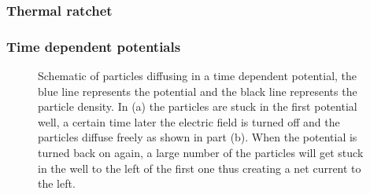 \documentclass[11pt]{article} %
\begin{document}
\subsubsection{Thermal ratchet}
\cite{Pedro2014}

\subsubsection{Time dependent potentials}

\begin{figure}[tb]
	\centering
\quad
\caption{Schematic of particles diffusing in a time dependent potential, the blue line represents the potential and the black line represents the particle density. In (a) the particles are stuck in the first potential well, a certain time later the electric field is turned off and the particles diffuse freely as shown in part (b). When the potential is turned back on again, a large number of the particles will get stuck in the well to the left of the first one thus creating a net current to the left.}
\label{fig:TimeDependent}
\end{figure}
\end{document}
